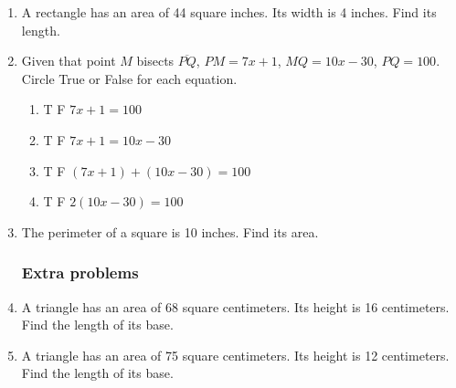 \begin{enumerate}
\item A rectangle has an area of 44 square inches. Its width is 4 inches. Find its length.
\vspace{3.0cm}

\item Given that point $M$ bisects $\overline{PQ}$, $PM=7x+1$, $MQ=10x-30$, $PQ=100$. Circle True or False for each equation.
  \begin{multicols}{2}
    \begin{enumerate}
      \item T \quad F \quad $7x+1=100$
      \item T \quad F \quad $7x+1=10x-30$
      \item T \quad F \quad $(7x+1) + (10x-30) = 100$
      \item T \quad F \quad $2(10x-30)=100$
    \end{enumerate}
  \end{multicols}

\newpage
\item The perimeter of a square is 10 inches. Find its area. \vspace{2cm}




\newpage
\subsubsection*{Extra problems}
\item A triangle has an area of 68 square centimeters. Its height is 16 centimeters. Find the length of its base. \vspace{2cm}

\item A triangle has an area of 75 square centimeters. Its height is 12 centimeters. Find the length of its base. \vspace{2cm}


\end{enumerate}

